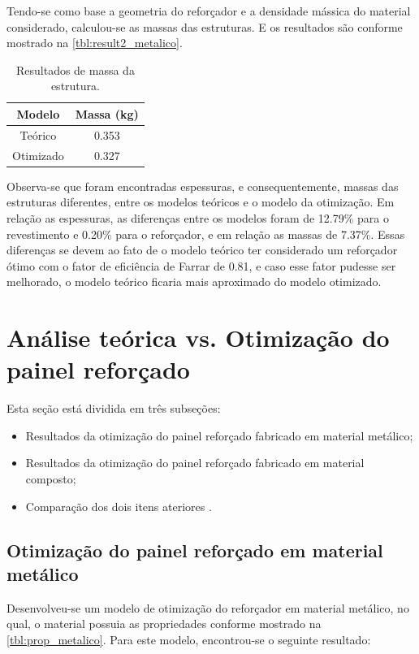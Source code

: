 Tendo-se como base a geometria do reforçador e a densidade mássica do material considerado, calculou-se as massas das estruturas. E os resultados são conforme mostrado na \autoref{tbl:result2_metalico}.

\begin{table}[h]
\centering
\begin{tabular}{cc}
\toprule
Modelo & Massa (kg) \\ \midrule
Teórico & 0.353\\
Otimizado & 0.327\\
\bottomrule
\end{tabular}
\caption{Resultados de massa da estrutura.}
\label{tbl:result2_metalico}
\end{table}

Observa-se que foram encontradas espessuras, e consequentemente, massas das estruturas diferentes, entre os modelos teóricos e o modelo da otimização.
Em relação as espessuras, as diferenças entre os modelos foram de 12.79\% para o revestimento e 0.20\% para o reforçador, e em relação as massas de 7.37\%. Essas diferenças se devem ao fato de o modelo teórico ter considerado um reforçador ótimo com o fator de eficiência de Farrar de 0.81, e caso esse fator pudesse ser melhorado, o modelo teórico ficaria mais aproximado do modelo otimizado.

\section{Análise teórica vs. Otimização do painel reforçado}
Esta seção está dividida em três subseções:
\begin{itemize}
\item Resultados da otimização do painel reforçado fabricado em material metálico;
\item Resultados da otimização do painel reforçado fabricado em material composto;
\item Comparação dos dois itens ateriores .
\end{itemize}

\subsection{Otimização do painel reforçado em material metálico}
Desenvolveu-se um modelo de otimização do reforçador em material metálico, no qual, o material possuia as propriedades conforme mostrado na \autoref{tbl:prop_metalico}. Para este modelo, encontrou-se o seguinte resultado:\

